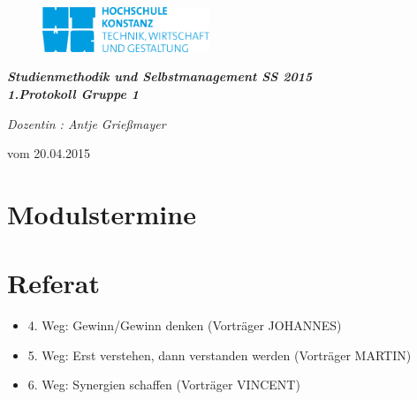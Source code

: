\documentclass[11pt,a4paper]{article}
\begin{document}
	\begin{figure}
  	\hspace*{-15.0mm} {\includegraphics[width=50mm]{logo}}
  	\end{figure}
  
\hspace{10mm}
\begin{center}

\textit{\textbf{\Huge{ Studienmethodik und Selbstmanagement  SS 2015}}}\\
\emph{\textbf{1.Protokoll Gruppe 1} }
\begin{flushleft}
\textit{ Dozentin :  Antje Grießmayer }
\end{flushleft}

\end{center}
\begin{flushright}
vom 20.04.2015
\end{flushright}
\section*{Modulstermine}

\section*{Referat}

\begin{itemize}
\item 4. Weg: Gewinn/Gewinn denken  (Vorträger JOHANNES)
\item 5. Weg: Erst verstehen, dann verstanden werden (Vorträger MARTIN)
\item 6. Weg: Synergien schaffen (Vorträger VINCENT)
\end{itemize}
\end{document}
